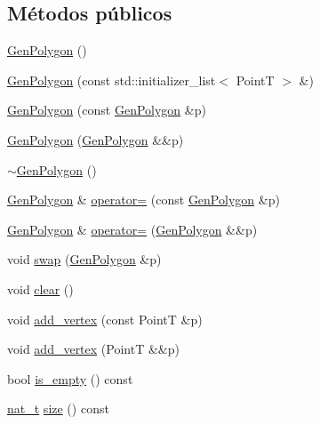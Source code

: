 \subsection*{Métodos públicos}
\begin{DoxyCompactItemize}
\item 
\hyperlink{class_designar_1_1_gen_polygon_a309794dce5861b9f5c158ea48a01be3e}{Gen\+Polygon} ()
\item 
\hyperlink{class_designar_1_1_gen_polygon_ac5ac34d76225f9c1d8895753f9e22ae8}{Gen\+Polygon} (const std\+::initializer\+\_\+list$<$ PointT $>$ \&)
\item 
\hyperlink{class_designar_1_1_gen_polygon_a8dd52177ce8635fb198a12cc62bdb44f}{Gen\+Polygon} (const \hyperlink{class_designar_1_1_gen_polygon}{Gen\+Polygon} \&p)
\item 
\hyperlink{class_designar_1_1_gen_polygon_af8cd6e919aacfbefd4d719f3c4d66623}{Gen\+Polygon} (\hyperlink{class_designar_1_1_gen_polygon}{Gen\+Polygon} \&\&p)
\item 
\hyperlink{class_designar_1_1_gen_polygon_ad23629fffafdf4f9c01a2db01e5cec9a}{$\sim$\+Gen\+Polygon} ()
\item 
\hyperlink{class_designar_1_1_gen_polygon}{Gen\+Polygon} \& \hyperlink{class_designar_1_1_gen_polygon_a83919ff0fa706a813d2d3bdebc4d644b}{operator=} (const \hyperlink{class_designar_1_1_gen_polygon}{Gen\+Polygon} \&p)
\item 
\hyperlink{class_designar_1_1_gen_polygon}{Gen\+Polygon} \& \hyperlink{class_designar_1_1_gen_polygon_ab38a83d2d3f9e9ab74d150a3def73ba3}{operator=} (\hyperlink{class_designar_1_1_gen_polygon}{Gen\+Polygon} \&\&p)
\item 
void \hyperlink{class_designar_1_1_gen_polygon_ac3c88479623a86d9f49c24676f837c0d}{swap} (\hyperlink{class_designar_1_1_gen_polygon}{Gen\+Polygon} \&p)
\item 
void \hyperlink{class_designar_1_1_gen_polygon_a1f16b49e951787ee8afff43ae1957a8b}{clear} ()
\item 
void \hyperlink{class_designar_1_1_gen_polygon_a3e059181e8c356f814bdf298da82f305}{add\+\_\+vertex} (const PointT \&p)
\item 
void \hyperlink{class_designar_1_1_gen_polygon_a0236ff66d05f2340c9412d5a6f5dc813}{add\+\_\+vertex} (PointT \&\&p)
\item 
bool \hyperlink{class_designar_1_1_gen_polygon_a71494c73881d1281048a24d4d75b67f1}{is\+\_\+empty} () const
\item 
\hyperlink{namespace_designar_aa72662848b9f4815e7bf31a7cf3e33d1}{nat\+\_\+t} \hyperlink{class_designar_1_1_gen_polygon_a7e39723b98f9fd7dabe41de58cf29575}{size} () const

\end{DoxyCompactItemize}
